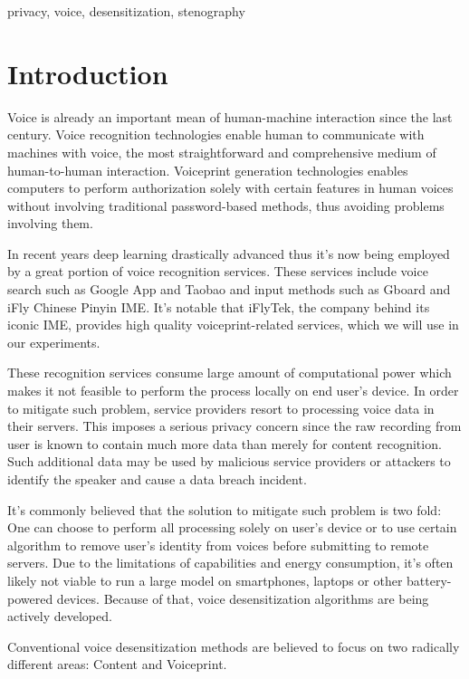 \documentclass[journal]{IEEEtran} %
\begin{document}
\begin{IEEEkeywords}
    privacy, voice, desensitization, stenography
\end{IEEEkeywords}

\section{Introduction}

Voice is already an important mean of human-machine interaction since the last century. Voice recognition technologies enable human to communicate with machines with voice, the most straightforward and comprehensive medium of human-to-human interaction. Voiceprint generation technologies enables computers to perform authorization solely with certain features in human voices without involving traditional password-based methods, thus avoiding problems involving them.

In recent years deep learning drastically advanced thus it's now being employed by a great portion of voice recognition services. These services include voice search such as Google App and Taobao and input methods such as Gboard and iFly Chinese Pinyin IME. It's notable that iFlyTek, the company behind its iconic IME, provides high quality voiceprint-related services, which we will use in our experiments.

These recognition services consume large amount of computational power which makes it not feasible to perform the process locally on end user's device. In order to mitigate such problem, service providers resort to processing voice data in their servers. This imposes a serious privacy concern since the raw recording from user is known to contain much more data than merely for content recognition. Such additional data may be used by malicious service providers or attackers to identify the speaker and cause a data breach incident. 

It's commonly believed that the solution to mitigate such problem is two fold: One can choose to perform all processing solely on user's device or to use certain algorithm to remove user's identity from voices before submitting to remote servers. Due to the limitations of capabilities and energy consumption, it's often likely not viable to run a large model on smartphones, laptops or other battery-powered devices. Because of that, voice desensitization algorithms are being actively developed.

Conventional voice desensitization methods are believed to focus on two radically different areas: Content and Voiceprint.
\end{document}
